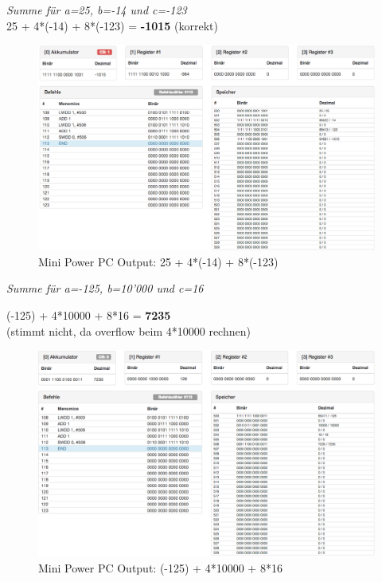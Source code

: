 \documentclass[10pt]{article}
\begin{document}
\begin{enumerate}[label=\alph*)]
			\textit{Summe für a=25, b=-14 und c=-123}\\
			25 + 4*(-14) + 8*(-123) = \textbf{-1015} (korrekt)
			
			\begin{figure}[H]
				\centering
				\includegraphics[width=\textwidth]{images/4c_b.png}
				\caption{Mini Power PC Output: 25 + 4*(-14) + 8*(-123)}
				\label{fig:Bild1}
			\end{figure}
			
			
			\textit{Summe für a=-125, b=10’000 und c=16}
			
			(-125) + 4*10000 + 8*16 = \textbf{7235}\\
			(stimmt nicht, da overflow beim 4*10000 rechnen)
			
			\begin{figure}[H]
				\centering
				\includegraphics[width=\textwidth]{images/4c_c.png}
				\caption{Mini Power PC Output: (-125) + 4*10000 + 8*16}
				\label{fig:Bild1}
			\end{figure}
			

\end{enumerate}
\end{document}
